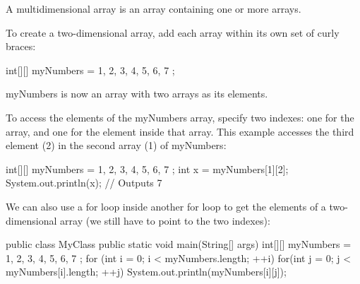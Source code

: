 
A multidimensional array is an array containing one or more arrays.

To create a two-dimensional array, add each array within its own set of curly braces:

\begin{code}
int[][] myNumbers = { {1, 2, 3, 4}, {5, 6, 7} };
\end{code}

myNumbers is now an array with two arrays as its elements.

To access the elements of the myNumbers array, specify two indexes: one for the array, and one for the element inside that array. This example accesses the third element (2) in the second array (1) of myNumbers:

\begin{code}
int[][] myNumbers = { {1, 2, 3, 4}, {5, 6, 7} };
int x = myNumbers[1][2];
System.out.println(x); // Outputs 7
\end{code}

We can also use a for loop inside another for loop to get the elements of a two-dimensional array (we still have to point to the two indexes):

\begin{code}
public class MyClass {
  public static void main(String[] args) {
    int[][] myNumbers = { {1, 2, 3, 4}, {5, 6, 7} };
    for (int i = 0; i < myNumbers.length; ++i) {
      for(int j = 0; j < myNumbers[i].length; ++j) {
        System.out.println(myNumbers[i][j]);
      }
    }
  }
}
\end{code}






